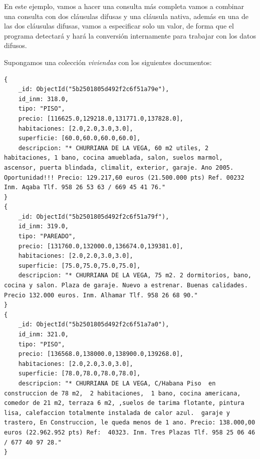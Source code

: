 \begin{example}
En este ejemplo, vamos a hacer una consulta más completa vamos a combinar una consulta con dos cláusulas difusas y una cláusula nativa, además en una de las dos cláusulas difusas, vamos a especificar solo un valor, de forma que el programa detectará y hará la conversión internamente para trabajar con los datos difusos.

Supongamos una colección \textit{viviendas} con los siguientes documentos:
\begin{lstlisting}[numbers=none]
{
    _id: ObjectId("5b2501805d492f2c6f51a79e"),
    id_inm: 318.0,
    tipo: "PISO",
    precio: [116625.0,129218.0,131771.0,137828.0],
    habitaciones: [2.0,2.0,3.0,3.0],
    superficie: [60.0,60.0,60.0,60.0],
    descripcion: "* CHURRIANA DE LA VEGA, 60 m2 utiles, 2 habitaciones, 1 bano, cocina amueblada, salon, suelos marmol, ascensor, puerta blindada, climalit, exterior, garaje. Ano 2005. Oportunidad!!! Precio: 129.217,60 euros (21.500.000 pts) Ref. 00232 Inm. Aqaba Tlf. 958 26 53 63 / 669 45 41 76."
}
{
    _id: ObjectId("5b2501805d492f2c6f51a79f"),
    id_inm: 319.0,
    tipo: "PAREADO",
    precio: [131760.0,132000.0,136674.0,139381.0],
    habitaciones: [2.0,2.0,3.0,3.0],
    superficie: [75.0,75.0,75.0,75.0],
    descripcion: "* CHURRIANA DE LA VEGA, 75 m2. 2 dormitorios, bano, cocina y salon. Plaza de garaje. Nuevo a estrenar. Buenas calidades. Precio 132.000 euros. Inm. Alhamar Tlf. 958 26 68 90."
}
{
    _id: ObjectId("5b2501805d492f2c6f51a7a0"),
    id_inm: 321.0,
    tipo: "PISO",
    precio: [136568.0,138000.0,138900.0,139268.0],
    habitaciones: [2.0,2.0,3.0,3.0],
    superficie: [78.0,78.0,78.0,78.0],
    descripcion: "* CHURRIANA DE LA VEGA, C/Habana Piso  en construccion de 78 m2,  2 habitaciones,  1 bano, cocina americana, comedor de 21 m2, terraza 6 m2, ,suelos de tarima flotante, pintura lisa, calefaccion totalmente instalada de calor azul.  garaje y trastero, En Construccion, le queda menos de 1 ano. Precio: 138.000,00 euros (22.962.952 pts) Ref:  40323. Inm. Tres Plazas Tlf. 958 25 06 46 / 677 40 97 28."
}
\end{lstlisting}


\end{example}
